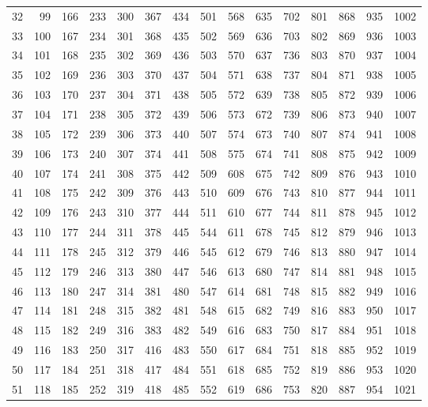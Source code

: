 \documentclass{assignment}
\begin{document}
\begin{tabular}{r r r r r r r r r r r r r r r}
32 & 99 & 166 & 233 & 300 & 367 & 434 & 501 & 568 & 635 & 702 & 801 & 868 & 935 & 1002 \\
33 & 100 & 167 & 234 & 301 & 368 & 435 & 502 & 569 & 636 & 703 & 802 & 869 & 936 & 1003 \\
34 & 101 & 168 & 235 & 302 & 369 & 436 & 503 & 570 & 637 & 736 & 803 & 870 & 937 & 1004 \\
35 & 102 & 169 & 236 & 303 & 370 & 437 & 504 & 571 & 638 & 737 & 804 & 871 & 938 & 1005 \\
36 & 103 & 170 & 237 & 304 & 371 & 438 & 505 & 572 & 639 & 738 & 805 & 872 & 939 & 1006 \\
37 & 104 & 171 & 238 & 305 & 372 & 439 & 506 & 573 & 672 & 739 & 806 & 873 & 940 & 1007 \\
38 & 105 & 172 & 239 & 306 & 373 & 440 & 507 & 574 & 673 & 740 & 807 & 874 & 941 & 1008 \\
39 & 106 & 173 & 240 & 307 & 374 & 441 & 508 & 575 & 674 & 741 & 808 & 875 & 942 & 1009 \\
40 & 107 & 174 & 241 & 308 & 375 & 442 & 509 & 608 & 675 & 742 & 809 & 876 & 943 & 1010 \\
41 & 108 & 175 & 242 & 309 & 376 & 443 & 510 & 609 & 676 & 743 & 810 & 877 & 944 & 1011 \\
42 & 109 & 176 & 243 & 310 & 377 & 444 & 511 & 610 & 677 & 744 & 811 & 878 & 945 & 1012 \\
43 & 110 & 177 & 244 & 311 & 378 & 445 & 544 & 611 & 678 & 745 & 812 & 879 & 946 & 1013 \\
44 & 111 & 178 & 245 & 312 & 379 & 446 & 545 & 612 & 679 & 746 & 813 & 880 & 947 & 1014 \\
45 & 112 & 179 & 246 & 313 & 380 & 447 & 546 & 613 & 680 & 747 & 814 & 881 & 948 & 1015 \\
46 & 113 & 180 & 247 & 314 & 381 & 480 & 547 & 614 & 681 & 748 & 815 & 882 & 949 & 1016 \\
47 & 114 & 181 & 248 & 315 & 382 & 481 & 548 & 615 & 682 & 749 & 816 & 883 & 950 & 1017 \\
48 & 115 & 182 & 249 & 316 & 383 & 482 & 549 & 616 & 683 & 750 & 817 & 884 & 951 & 1018 \\
49 & 116 & 183 & 250 & 317 & 416 & 483 & 550 & 617 & 684 & 751 & 818 & 885 & 952 & 1019 \\
50 & 117 & 184 & 251 & 318 & 417 & 484 & 551 & 618 & 685 & 752 & 819 & 886 & 953 & 1020 \\
51 & 118 & 185 & 252 & 319 & 418 & 485 & 552 & 619 & 686 & 753 & 820 & 887 & 954 & 1021 \\

\end{tabular}
\end{document}
